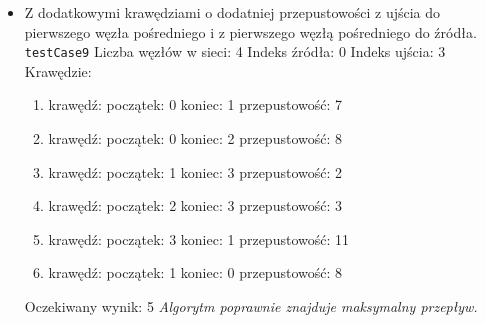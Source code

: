 \begin{itemize}[nosep]
    \item Z dodatkowymi krawędziami o dodatniej przepustowości z ujścia do
    pierwszego węzła pośredniego i z pierwszego węzłą pośredniego do źródła.
    \texttt{testCase9}
    Liczba węzłów w sieci: 4
    Indeks źródła: 0
    Indeks ujścia: 3
    Krawędzie:
    \begin{enumerate}[nosep]
        \item krawędź:
        początek: 0
        koniec: 1
        przepustowość: 7
        \item krawędź:
        początek: 0
        koniec: 2
        przepustowość: 8
        \item krawędź:
        początek: 1
        koniec: 3
        przepustowość: 2
        \item krawędź:
        początek: 2
        koniec: 3
        przepustowość: 3
        \item krawędź:
        początek: 3
        koniec: 1
        przepustowość: 11
        \item krawędź:
        początek: 1
        koniec: 0
        przepustowość: 8
    \end{enumerate}
    Oczekiwany wynik: 5
    \emph{Algorytm poprawnie znajduje maksymalny przepływ.}
\end{itemize}


